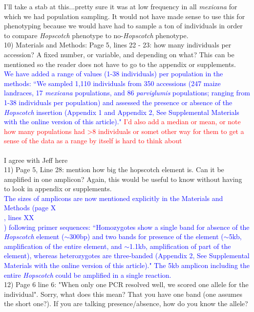 \documentclass[11pt]{article}
\newcommand{\res}[1]{\noindent \textcolor{blue}{{#1}} \\}
\newcommand{\jri}[1]{\noindent \textcolor{red}{{#1}} \\}
\newcommand{\mbh}[1]{\noindent \textcolor{Dandelion}{{#1}}\\}
\begin{document}
\mbh{I'll take a stab at this...pretty sure it was at low frequency in all \emph{mexicana} for which we had population sampling.  It would not have made sense to use this for phenotyping because we would have had to sample a ton of individuals in order to compare \emph{Hopscotch} phenotype to no-\emph{Hopscotch} phenotype.}

10) Materials and Methods:
Page 5, lines 22 - 23: how many individuals per accession? A fixed number, or variable, and depending on what? This can be mentioned so the reader does not have to go to the appendix or supplements.\\ 

\res{We have added a range of values (1-38 individuals) per population in the methods: ``We sampled 1,110 individuals from 350 accessions (247 maize landraces, 17 \emph{mexicana} populations, and 86 \emph{parviglumis} populations; ranging from 1-38 individuals per population) and assessed the presence or absence of the \emph{Hopscotch} insertion (Appendix 1 and Appendix 2, See Supplemental Materials with the online version of this article)." \jri{I'd also add a median or mean, or note how many populations had >8 individuals or somet other way for them to get a sense of the data as a range by itself is hard to think about}}

\mbh{I agree with Jeff here}


11) Page 5, Line 28: mention how big the hopscotch element is.  Can it be amplified in one amplicon? Again, this would be useful to know without having to look in appendix or supplements.\\

\res{The sizes of amplicons are now mentioned explicitly in the Materials and Methods (page \mbh{X}, lines \mbh{XX}) following primer sequences: 
``Homozygotes show a single band for absence of the \emph{Hopscotch} element ($\sim$300bp) and two bands for presence of the element ($\sim$5kb, amplification of the entire element, and $\sim$1.1kb, amplification of part of the element), whereas heterozygotes are three-banded (Appendix 2, See Supplemental Materials with the online version of this article)."
The 5kb amplicon including the entire \emph{Hopscotch} could be amplified in a single reaction.}

12) Page 6 line 6: "When only one PCR resolved well, we scored one allele for the individual".  Sorry, what does this mean? That you have one band (one assumes the short one?). If you are talking presence/absence, how do you know the allele?\\ 
\end{document}
